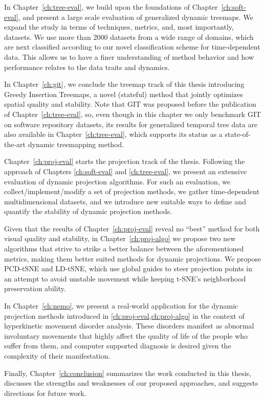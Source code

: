 In Chapter~\ref{ch:tree-eval}, we build upon the foundations of Chapter~\ref{ch:soft-eval}, and present a large scale evaluation of generalized dynamic treemaps. We expand the study in terms of techniques, metrics, and, most importantly, datasets. We use more than 2000 datasets from a wide range of domains, which are next classified according to our novel classification scheme for time-dependent data. This allows us to have a finer understanding of method behavior and how performance relates to the data traits and dynamics. 

In Chapter~\ref{ch:git}, we conclude the treemap track of this thesis introducing Greedy Insertion Treemaps, a novel (stateful) method that jointly optimizes spatial quality and stability. Note that GIT was proposed before the publication of Chapter~\ref{ch:tree-eval}, so, even though in this chapter we only benchmark GIT on software repository datasets, its results for generalized temporal tree data are also available in Chapter~\ref{ch:tree-eval}, which supports its status as a state-of-the-art dynamic treemapping method. 

Chapter~\ref{ch:proj-eval} starts the projection track of the thesis. Following the approach of Chapters \ref{ch:soft-eval} and \ref{ch:tree-eval}, we present an extensive evaluation of dynamic projection algorithms. For such an evaluation, we collect/implement/modify a set of projection methods, we gather time-dependent multidimensional datasets, and we introduce new suitable ways to define and quantify the stability of dynamic projection methods.

Given that the results of Chapter~\ref{ch:proj-eval} reveal no ``best'' method for both visual quality and stability, in Chapter~\ref{ch:proj-algo} we propose two new algorithms that strive to strike a better balance between the aforementioned metrics, making them better suited methods for dynamic projections. 
We propose PCD-tSNE and LD-tSNE, which use global guides to steer projection points in an attempt to avoid unstable movement while keeping t-SNE’s neighborhood preservation ability. 

In Chapter~\ref{ch:nemo}, we present a real-world application for the dynamic projection methods introduced in \cref{ch:proj-eval,ch:proj-algo} in the context of hyperkinetic movement disorder analysis. These disorders manifest as abnormal involuntary movements that highly affect the quality of life of the people who suffer from them, and computer supported diagnosis is desired given the complexity of their manifestation.


Finally, Chapter~\ref{ch:conclusion} summarizes the work conducted in this thesis, discusses the strengths and weaknesses of our proposed approaches, and suggests directions for future work.

